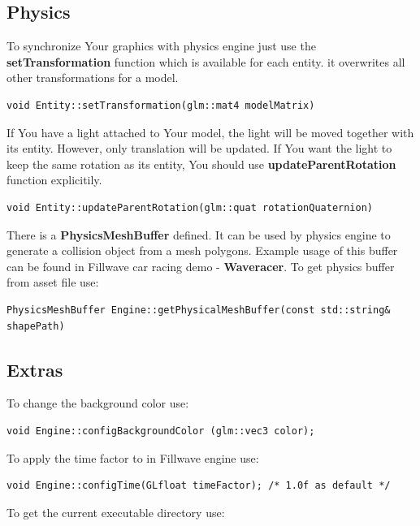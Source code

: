 \documentclass{article}
\begin{document}
\subsection{Physics}\label{sec:Physics}
\indent \indent To synchronize Your graphics with physics engine just use the \textbf{setTransformation} function which is available for each entity. it overwrites all other transformations for a model.

\begin{lstlisting}
void Entity::setTransformation(glm::mat4 modelMatrix)
\end{lstlisting}

\indent \indent If You have a light attached to Your model, the light will be moved together with its entity. However, only translation will be updated. If You want the light to keep the same rotation as its entity, You should use \textbf{updateParentRotation} function explicitily. 

\begin{lstlisting}
void Entity::updateParentRotation(glm::quat rotationQuaternion)
\end{lstlisting}

\indent \indent There is a \textbf{PhysicsMeshBuffer} defined. It can be used by physics engine to generate a collision object from a mesh polygons. Example usage of this buffer can be found in Fillwave car racing demo - \textbf{Waveracer}. To get physics buffer from asset file use:

\begin{lstlisting}
PhysicsMeshBuffer Engine::getPhysicalMeshBuffer(const std::string& shapePath)
\end{lstlisting}

\subsection{Extras}\label{sec:Extras}
\indent To change the background color use:

\begin{lstlisting}
void Engine::configBackgroundColor (glm::vec3 color);
\end{lstlisting}

\indent To apply the time factor to in Fillwave engine use:

\begin{lstlisting}
void Engine::configTime(GLfloat timeFactor); /* 1.0f as default */
\end{lstlisting}

\indent To get the current executable directory use:
\end{document}
